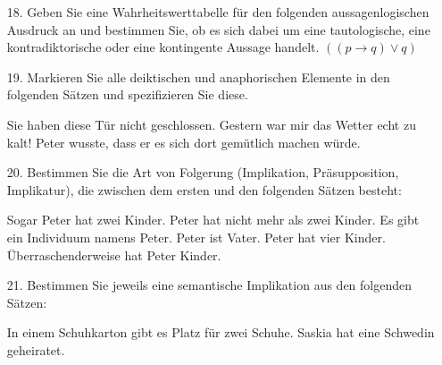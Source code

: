 \begin{frame}

\begin{itemize}
	
	\item[18.] Geben Sie eine Wahrheitswerttabelle für den folgenden aussagenlogischen Ausdruck an und bestimmen Sie, ob es sich dabei um eine tautologische, eine kontradiktorische oder eine kontingente Aussage handelt.
	\ea \label{ex:23} $((p \rightarrow q) \lor q)$
	\z 
	
	\item[19.] Markieren Sie alle deiktischen und anaphorischen Elemente in den folgenden Sätzen und spezifizieren Sie diese.
	
	\eal \label{ex:24}
	\ex Sie haben diese Tür nicht geschlossen.
	\ex Gestern war mir das Wetter echt zu kalt!
	\ex Peter wusste, dass er es sich dort gemütlich machen würde. 
	\zl
	
\end{itemize}

\end{frame}


\begin{frame}

\begin{itemize}
	\item[20.] Bestimmen Sie die Art von Folgerung (Implikation, Präsupposition, Implikatur), die zwischen dem ersten und den folgenden Sätzen besteht:
	
	\ea \label{ex:25} Sogar Peter hat zwei Kinder. 
	\ea Peter hat nicht mehr als zwei Kinder.
	\ex Es gibt ein Individuum namens Peter.
	\ex Peter ist Vater.
	\ex Peter hat vier Kinder.
	\ex Überraschenderweise hat Peter Kinder.
	\z
	\z 
	
	\item[21.] Bestimmen Sie jeweils eine semantische Implikation aus den folgenden Sätzen:
	
	\eal \label{ex:26}
	\ex In einem Schuhkarton gibt es Platz für zwei Schuhe.
	\ex Saskia hat eine Schwedin geheiratet.
	\zl
		
\end{itemize}

\end{frame}


